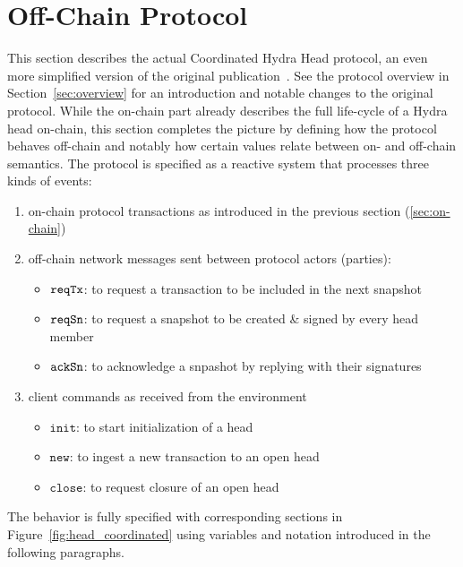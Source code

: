 \section{Off-Chain Protocol}\label{sec:offchain}

This section describes the actual Coordinated Hydra Head protocol, an even more
simplified version of the original publication~\cite{hydrahead20}. See the
protocol overview in Section~\ref{sec:overview} for an introduction and notable
changes to the original protocol. While the on-chain part already describes the
full life-cycle of a Hydra head on-chain, this section completes the picture by
defining how the protocol behaves off-chain and notably how certain values
relate between on- and off-chain semantics. The protocol is specified as a
reactive system that processes three kinds of events:
\begin{enumerate}
  \item on-chain protocol transactions as introduced in the previous section (\ref{sec:on-chain})
  \item off-chain network messages sent between protocol actors (parties):
    \begin{itemize}
      \item $\mathtt{reqTx}$: to request a transaction to be included in the next snapshot
      \item $\mathtt{reqSn}$: to request a snapshot to be created \& signed by every head member
      \item $\mathtt{ackSn}$: to acknowledge a snpashot by replying with their signatures
    \end{itemize}
  \item client commands as received from the environment
    \begin{itemize}
      \item $\mathtt{init}$: to start initialization of a head
      \item $\mathtt{new}$: to ingest a new transaction to an open head
      \item $\mathtt{close}$: to request closure of an open head
    \end{itemize}
\end{enumerate}

The behavior is fully specified with corresponding sections in
Figure~\ref{fig:head_coordinated} using variables and notation introduced in the
following paragraphs.

